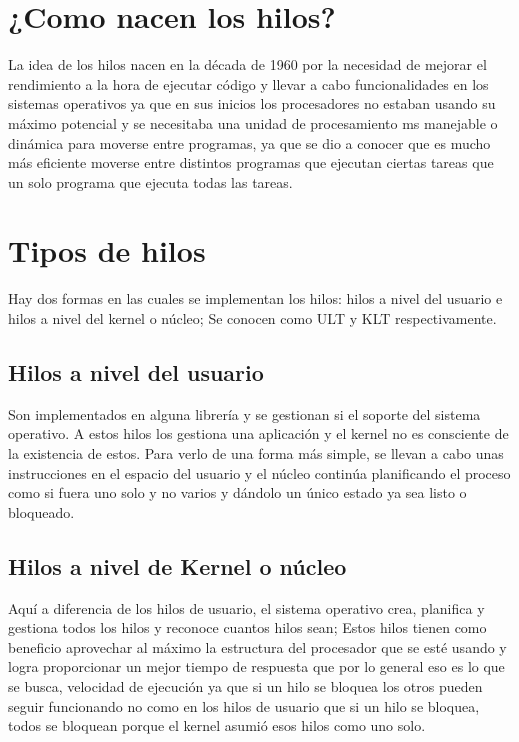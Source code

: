 \documentclass[11pt]{article}
\begin{document}
\section{¿Como nacen los hilos?}
La idea de los hilos nacen en la década de 1960 por la necesidad de mejorar el rendimiento a la hora de ejecutar código y llevar a cabo funcionalidades en los sistemas operativos ya que en sus inicios los procesadores no estaban usando su máximo potencial y se necesitaba una unidad de procesamiento ms manejable o dinámica para moverse entre programas, ya que se dio a conocer que es mucho más eficiente moverse entre distintos programas que ejecutan ciertas tareas que un solo programa que ejecuta todas las tareas.
\cite{Hilos2}

\section{Tipos de hilos}
Hay dos formas en las cuales se implementan los hilos: hilos a nivel del usuario e hilos a nivel del kernel o núcleo; Se conocen como ULT y KLT respectivamente.

\subsection{Hilos a nivel del usuario}
Son implementados en alguna librería y se gestionan si el soporte del sistema operativo. A estos hilos los gestiona una aplicación y el kernel no es consciente de la existencia de estos. Para verlo de una forma más simple, se llevan a cabo unas instrucciones en el espacio del usuario y el núcleo continúa planificando el proceso como si fuera uno solo y no varios y dándolo un único estado ya sea listo o bloqueado.

\subsection{Hilos a nivel de Kernel o núcleo}
Aquí a diferencia de los hilos de usuario, el sistema operativo crea, planifica y gestiona todos los hilos y reconoce cuantos hilos sean; Estos hilos tienen como beneficio aprovechar al máximo la estructura del procesador que se esté usando y logra proporcionar un mejor tiempo de respuesta que por lo general eso es lo que se busca, velocidad de ejecución ya que si un hilo se bloquea los otros pueden seguir funcionando no como en los hilos de usuario que si un hilo se bloquea, todos se bloquean porque el kernel asumió esos hilos como uno solo.
\end{document}
